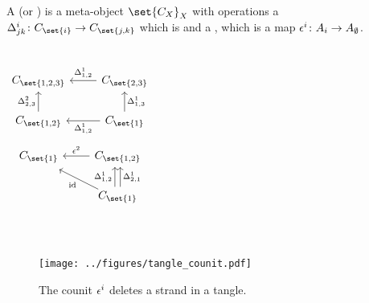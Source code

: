 \documentclass{beamer}
\theoremstyle{theorem}
\begin{document}
\begin{frame}
        \begin{definition}
                A  (or ) is a meta-object
                $\set{C_X}_X$ with operations a 
                $\map {\comult^{i}_{jk}} {C_{\set{i}}} {C_{\set{j,k}}}$ which is
                 and a , which is a
                map $\map {\counit^{i}} {A_{i}} {A_{\emptyset}}$.
        \end{definition}
        \begin{columns}
        \begin{equation*}\label{eq:cd_comult}
        \begin{tikzcd}[ampersand replacement=\&]
                C_{\set{1,2,3}}
                \&C_{\set{2,3}}
                        \lar["\comult^{1}_{{1,2}}"'] \\
                C_{\set{1,2}}
                        \uar["\comult^{2}_{2,3}"]
                \&C_{\set{1}}
                        \lar["\comult^{1}_{1,2}"]
                        \uar["\comult^{1}_{1,3}"']
        \end{tikzcd}
        \end{equation*}
        \begin{equation*}\label{eq:cd_counit}
        \begin{tikzcd}[ampersand replacement=\&]
                C_{\set{1}}
                \&C_{\set{1,2}}
                        \lar["\counit^{2}"']\\
                \&C_{\set{1}}
                        \ular["\id", shift left]
                        \uar["\comult^{1}_{1,2}", shift left]
                        \uar["\comult^{1}_{2,1}"', shift right] \\
        \end{tikzcd}
        \end{equation*}
        \end{columns}
\end{frame}

\begin{frame}
        \begin{figure}
                \centering
                \texttt{[image: ../figures/tangle\_counit.pdf]}
                \caption{The counit $\epsilon^i$ deletes a strand in a tangle.}
                \label{fig:tangle_counit}
        \end{figure}
\end{frame}
\end{document}

